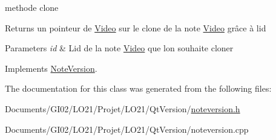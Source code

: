 methode clone 

\begin{DoxyReturn}{Returns}
un pointeur de \hyperlink{class_video}{Video} sur le clone de la note \hyperlink{class_video}{Video} grâce à l\textquotesingle{}id 
\end{DoxyReturn}

\begin{DoxyParams}{Parameters}
{\em id} & L\textquotesingle{}id de la note \hyperlink{class_video}{Video} que l\textquotesingle{}on souhaite cloner \\
\hline
\end{DoxyParams}


Implements \hyperlink{class_note_version_a7eb23a52291ec623b9bc1b6fe3e86c5a}{Note\+Version}.



The documentation for this class was generated from the following files\+:\begin{DoxyCompactItemize}
\item 
Documents/\+G\+I02/\+L\+O21/\+Projet/\+L\+O21/\+Qt\+Version/\hyperlink{noteversion_8h}{noteversion.\+h}\item 
Documents/\+G\+I02/\+L\+O21/\+Projet/\+L\+O21/\+Qt\+Version/noteversion.\+cpp\end{DoxyCompactItemize}
